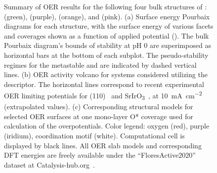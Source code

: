 \begin{figure}
\centering
{}
\caption{\label{fig:oer_volcano}
%
Summary of OER results for the following four bulk structures of \IrOx: \rIrOtwo (green), \aIrOthree (purple), \rIrOthree (orange), and \bIrOthree (pink).
%
(a) Surface energy Pourbaix diagrams for each structure, with the surface energy of various facets and coverages shown as a function of applied potential (\VRHE).
%
%
The bulk Pourbaix diagram's bounds of stability at pH \num{0} are superimposed as horizontal bars at the bottom of each subplot.
%
The pseudo-stability regimes for the metastable \bIrOthree and \rIrOthree are indicated by dashed vertical lines.
%
(b) OER activity volcano for \IrOx systems considered utilizing the \DGOmOH{} descriptor.
%
The horizontal lines correspond to recent experimental OER limiting potentials for \rIrOtwo (110)~\cite{Kuo2017} and SrIrO\textsubscript{3}~\cite{Seitz2016},
at \SI[mode=text]{10}{\mA\per\cm\squared} (extrapolated values).
%
(c) Corresponding structural models for selected OER surfaces at one mono-layer O* coverage used for calculation of the overpotentials.
%
Color legend: oxygen (red), purple (iridium), coordination motif (white).
%
Computational cell is displayed by black lines.
%
All OER slab models and corresponding DFT energies are freely available under the ``FloresActive2020''~\cite{upload_CatHub} dataset at Catalysis-hub.org~\cite{Winther2019}.
}
\end{figure}


